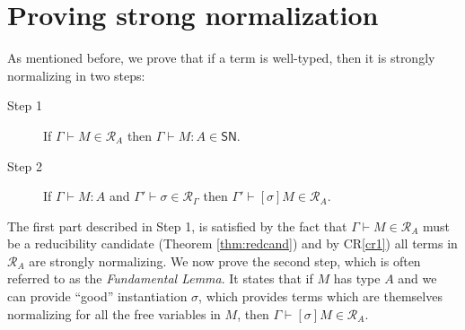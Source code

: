 \documentclass{article}
\newcommand{\SN}{\mathsf{SN}}
\newcommand{\CR}{\textsf{CR}}
\newcommand{\denot}[1]{\mathcal{R}_{#1}}
\newcommand{\inden}[3]{#1 \vdash #2 \in \denot{#3}}
\begin{document}
\section{Proving strong normalization}
As mentioned before, we prove that if a term is well-typed, then it is strongly normalizing in  two steps:

\begin{description}
\item[Step 1] If $\inden{\Gamma}{M}{A}$ then $\Gamma \vdash M : A \in \SN$.
\item[Step 2] If $\Gamma \vdash M : A$ and $\inden{\Gamma'}{\sigma}{\Gamma}$ then $\inden{\Gamma'}{[\sigma] M}{A}$.
\end{description}

The first part described in Step 1, is satisfied by the fact that $\inden{\Gamma}{M}{A}$ must be a reducibility candidate (Theorem \ref{thm:redcand}) and  by \CR \ref{cr1})  all terms in $\denot{A}$ are strongly normalizing. We now prove the second step, which is often referred to as the \emph{Fundamental Lemma}.
It states that if $M$ has type $A$ and we can provide ``good'' instantiation $\sigma$, which provides terms which are themselves normalizing for all the free variables in $M$, then $\inden{\Gamma}{[\sigma]M}{A}$.
\end{document}
